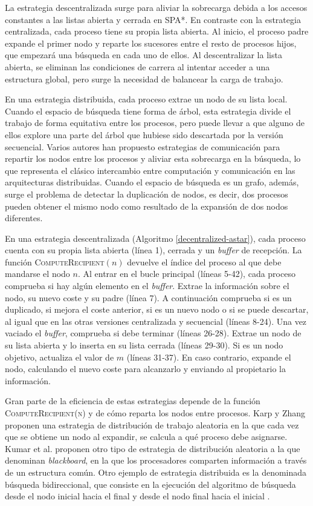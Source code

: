 \documentclass[a4paper,12pt]{article}
\begin{document}
La estrategia descentralizada surge para aliviar la sobrecarga debida a los accesos constantes a las listas abierta y cerrada en SPA*. En contraste con la estrategia centralizada, cada proceso tiene su propia lista abierta. Al inicio, el proceso padre expande el primer nodo y reparte los sucesores entre el resto de procesos hijos, que empezará una búsqueda en cada uno de ellos. Al descentralizar la lista abierta, se eliminan las condiciones de carrera al intentar acceder a una estructura global, pero surge la necesidad de balancear la carga de trabajo.

En una estrategia distribuida, cada proceso extrae un nodo de su lista local. Cuando el espacio de búsqueda tiene forma de árbol, esta estrategia divide el trabajo de forma equitativa entre los procesos, pero puede llevar a que alguno de ellos explore una parte del árbol que hubiese sido descartada por la versión secuencial. Varios autores han propuesto estrategias de comunicación para repartir los nodos entre los procesos y aliviar esta sobrecarga en la búsqueda, lo que representa el clásico intercambio entre computación y comunicación en las arquitecturas distribuidas. Cuando el espacio de búsqueda es un grafo, además, surge el problema de detectar la duplicación de nodos, es decir, dos procesos pueden obtener el mismo nodo como resultado de la expansión de dos nodos diferentes.

En una estrategia descentralizada (Algoritmo \ref{decentralized-astar}), cada proceso cuenta con su propia lista abierta (línea 1), cerrada y un \textit{buffer} de recepción. La función \textsc{ComputeRecipient}$(n)$ devuelve el índice del proceso al que debe mandarse el nodo $n$. Al entrar en el bucle principal (líneas 5-42), cada proceso comprueba si hay algún elemento en el \textit{buffer}. Extrae la información sobre el nodo, su nuevo coste y su padre (línea 7). A continuación comprueba si es un duplicado, si mejora el coste anterior, si es un nuevo nodo o si se puede descartar, al igual que en las otras versiones centralizada y secuencial (líneas 8-24). Una vez vaciado el \textit{buffer}, comprueba si debe terminar (líneas 26-28). Extrae un nodo de su lista abierta y lo inserta en su lista cerrada (líneas 29-30). Si es un nodo objetivo, actualiza el valor de $m$ (líneas 31-37). En caso contrario, expande el nodo, calculando el nuevo coste para alcanzarlo y enviando al propietario la información.

Gran parte de la eficiencia de estas estrategias depende de la función \textsc{ComputeRecipient(n)} y de cómo reparta los nodos entre procesos. Karp y Zhang \cite{karp1988randomized, karp1993randomized} proponen una estrategia de distribución de trabajo aleatoria en la que cada vez que se obtiene un nodo al expandir, se calcula a qué proceso debe asignarse. Kumar et al. \cite{kumar1988parallel} proponen otro tipo de estrategia de distribución aleatoria a la que denominan \textit{blackboard}, en la que los procesadores comparten información a través de un estructura común. Otro ejemplo de estrategia distribuida es la denominada búsqueda bidireccional, que consiste en la ejecución del algoritmo de búsqueda desde el nodo inicial hacia el final y desde el nodo final hacia el inicial \cite{rios2011pnba}.
\end{document}
